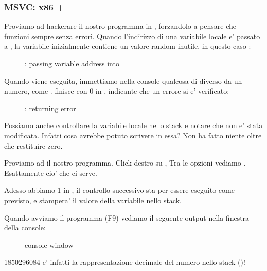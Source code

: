 \clearpage
\subsubsection{MSVC: x86 + \olly}

Proviamo ad hackerare il nostro programma in \olly, forzandolo a pensare che \scanf funzioni sempre senza errori.
Quando l'indirizzo di una variabile locale e' passato a \scanf, la variabile inizialmente contiene un valore random inutile, in questo caso :

\begin{figure}[H]
\centering
{}
\caption{\olly: passing variable address into \scanf}
\label{fig:scanf_ex3_olly_1}
\end{figure}

\clearpage
Quando \scanf viene eseguita, immettiamo nella console qualcosa di diverso da un numero, come .
\scanf finisce con 0 in \EAX, indicante che un errore si e' verificato:

\begin{figure}[H]
\centering
{}
\caption{\olly: \scanf returning error}
\label{fig:scanf_ex3_olly_2}
\end{figure}

Possiamo anche controllare la variabile locale nello stack e notare che non e' stata modificata.
Infatti cosa avrebbe potuto scrivere \scanf in essa? Non ha fatto niente oltre che restituire zero. 


Proviamo ad  il nostro programma.
Click destro su \EAX, 
Tra le opzioni vediamo .
Esattamente cio' che ci serve.

Adesso abbiamo 1 in \EAX, il controllo successivo sta per essere eseguito come previsto,
e \printf stampera' il valore della variabile nello stack.

Quando avviamo il programma (F9) vediamo il seguente output nella finestra della console:

\begin{figure}[H]
\centering
{}
\caption{console window}
\end{figure}

1850296084 e' infatti la rappresentazione decimale del numero nello stack ()!
